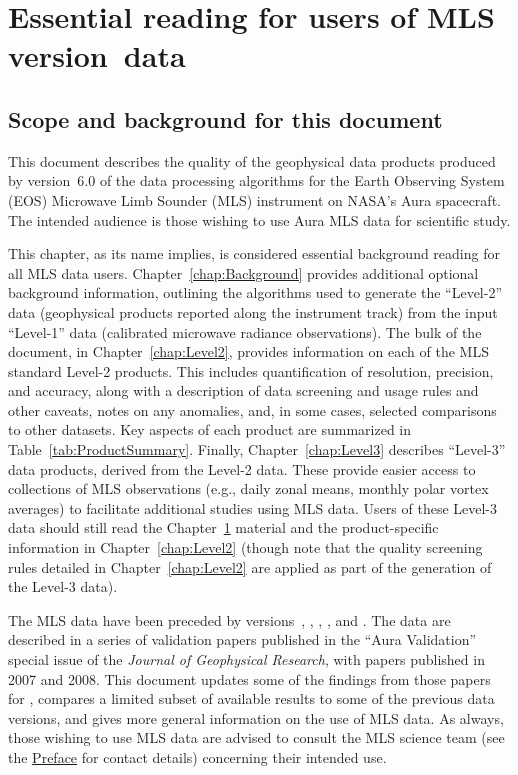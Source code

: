 \chapter{Essential reading for users of MLS version~\thisv data}
\label{chap:Essential}

\section{Scope and background for this document}

This document describes the quality of the geophysical data products produced by version~6.0 of the data processing algorithms for the Earth Observing System (EOS) Microwave Limb Sounder (MLS) instrument on NASA's Aura spacecraft. The intended audience is those wishing to use Aura MLS data for scientific study.

This chapter, as its name implies, is considered essential background reading for all MLS data users.  Chapter~\ref{chap:Background} provides additional optional background information, outlining the algorithms used to generate the ``\mbox{Level-2}'' data (geophysical products reported along the instrument track) from the input ``Level-1'' data (calibrated microwave radiance observations). The bulk of the document, in Chapter~\ref{chap:Level2}, provides information on each of the MLS standard \mbox{Level-2} products. This includes quantification of resolution, precision, and accuracy, along with a description of data screening and usage rules and other caveats, notes on any anomalies, and, in some cases, selected comparisons to other datasets. Key aspects of each product are summarized in Table~\ref{tab:ProductSummary}. Finally, Chapter~\ref{chap:Level3} describes ``\mbox{Level-3}'' data products, derived from the \mbox{Level-2} data. These provide easier access to collections of MLS observations (e.g., daily zonal means, monthly polar vortex averages) to facilitate additional studies using MLS data. Users of these \mbox{Level-3} data should still read the Chapter~\ref{chap:Essential} material and the product-specific information in Chapter~\ref{chap:Level2} (though note that the quality screening rules detailed in Chapter~\ref{chap:Level2} are applied as part of the generation of the \mbox{Level-3} data).

The MLS \thisv data have been preceded by versions~\vi, \vii, \viii, \viv, and \vv. The \vii data are described in a series of validation papers published in the ``Aura Validation'' special issue of the \emph{Journal of Geophysical Research}, with papers published in 2007 and 2008. This document updates some of the findings from those papers for \thisv, compares a limited subset of available \thisv results to some of the previous data versions, and gives more general information on the use of MLS data. As always, those wishing to use MLS data are advised to consult the MLS science team (see the \hyperref[chap:Preface]{Preface} for contact details) concerning their intended use.

